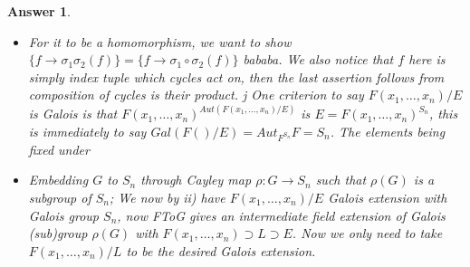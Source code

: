 \documentclass[11pt,leqno]{article}
\newcommand{\<}[1]{{\langle}#1 {\rangle}}
\theoremstyle{plain}
\newtheorem*{answer*}{Answer}
\theoremstyle{definition}
\theoremstyle{remark}
\numberwithin{equation}{section}
\begin{document}
\begin{enumerate}
\begin{answer*}
\begin{itemize}
            \item [ii)] For it to be a homomorphism, we want to show $\{f\rightarrow  \sigma_1\sigma_2(f) \}= \{f\rightarrow \sigma_1 \circ \sigma_2(f) \}  $ bababa. We also notice that $f$ here is simply index tuple which cycles act on, then the last assertion follows from composition of cycles is their product. j One criterion to say $F(x_1,\ldots,x_n)/E$ is Galois is that $F(x_1,\ldots,x_n)^{Aut(F(x_1,\ldots,x_n)/E)}$ is $E=F(x_1,\ldots,x_n)^{S_n}$, this is immediately to say $Gal(F()/E)=Aut_{F^{S_n}}F=S_n$. The elements being fixed under   
            
            \item [iii)] Embedding $G$ to $S_n$ through Cayley map $\rho:G\rightarrow S_n$ such that $\rho(G)$ is a subgroup of $S_n$;  We now by ii) have $F(x_1,\ldots,x_n)/E$ Galois extension with Galois group $S_n$, now FToG gives an intermediate field extension of Galois (sub)group  $\rho(G)$ with $F(x_1,\ldots,x_n) \supset L \supset E$. Now we only need to take  $F(x_1,\ldots,x_n) / L$ to be the desired Galois extension.    
            
        \end{itemize}
    \end{answer*}


\end{enumerate}
\end{document}
